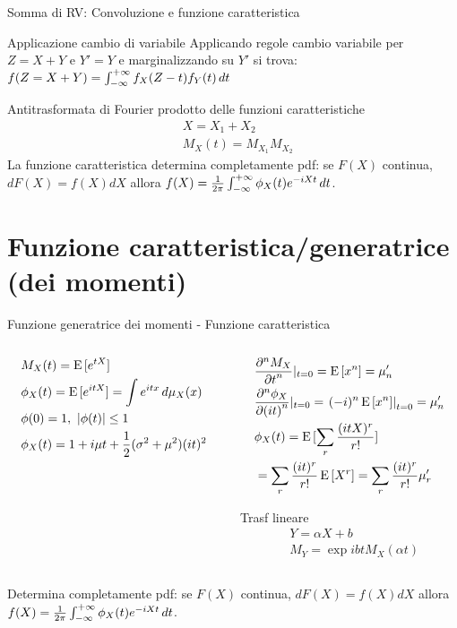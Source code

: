\begin{frame}{Somma di RV: Convoluzione e funzione caratteristica}
\begin{block}{Applicazione cambio di variabile}
Applicando regole cambio variabile per $Z=X+Y$ e $Y'=Y$ e marginalizzando su $Y'$ si trova: $f(Z=X+Y)=\intsinf{}f_X(Z-t)f_Y(t)\,dt$
\end{block}
\begin{block}{Antitrasformata di Fourier prodotto delle funzioni caratteristiche}
\begin{align*}
&X=X_1+X_2\\
&M_X(t)=M_{X_1}M_{X_2}
\end{align*}
La funzione caratteristica determina completamente pdf: se $F(X)$ continua, $dF(X)=f(X)dX$ allora $f(X)=\frac{1}{2\pi}\intsinf{}\phi_X(t)\exp{-iXt}\,dt$.
\end{block}

\end{frame}

\section{Funzione caratteristica/generatrice (dei momenti)}

\begin{frame}{Funzione generatrice dei momenti - Funzione caratteristica}
\begin{columns}[T]
	\begin{column}{0.5\textwidth}
		\begin{align*}
		&M_X(t)=\E{[\exp{tX}]}\\
		&\phi_X(t)=\E{[\exp{itX}]}=\int\exp{itx}\,d\mu_X(x)\\
		&\phi(0)=1,\ |\phi(t)|\leq1\\
		&\phi_X(t)=1+i\mu t+\frac{1}{2}(\sigma^2+\mu^2)(it)^2
		\end{align*}
	\end{column}
	\begin{column}{0.5\textwidth}
		\begin{align*}
		&\PDyn{t}{M_X}{n}|_{t=0}=\E{[x^n]}=\mu_n'\\
		&\PDyn{(it)}{\phi_X}{n}|_{t=0}=\left.(-i)^n\E{[x^n]}\right|_{t=0}=\mu_n'\\
		&\phi_X(t)=\E{[\sum_r\frac{(itX)^r}{r!}]}\\
		&=\sum_r\frac{(it)^r}{r!}\E{[X^r]}=\sum_r\frac{(it)^r}{r!}\mu_r'
		\end{align*}
		\begin{block}{Trasf lineare}
			\begin{align*}
			&Y=\alpha X+b\\
			&M_Y=\exp{ibt}M_X(\alpha t)
			\end{align*}
		\end{block}
	\end{column}
\end{columns}
Determina completamente pdf: se $F(X)$ continua, $dF(X)=f(X)dX$ allora $f(X)=\frac{1}{2\pi}\intsinf{}\phi_X(t)\exp{-iXt}\,dt$.
\end{frame}

